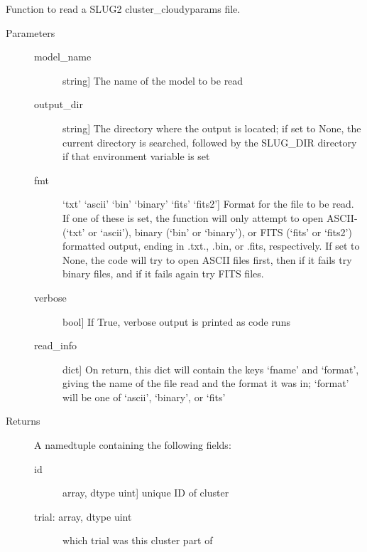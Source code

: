 \documentclass[letterpaper,10pt,english]{sphinxmanual}
\begin{document}
\begin{fulllineitems}
\label{cloudy:slugpy.cloudy.read_cluster_cloudyparams}
Function to read a SLUG2 cluster\_cloudyparams file.
\begin{description}
\item[{Parameters}] \leavevmode\begin{description}
\item[{model\_name}] \leavevmode{[}string{]}
The name of the model to be read

\item[{output\_dir}] \leavevmode{[}string{]}
The directory where the output is located; if set to None,
the current directory is searched, followed by the SLUG\_DIR
directory if that environment variable is set

\item[{fmt}] \leavevmode{[}`txt' \textbar{} `ascii' \textbar{} `bin' \textbar{} `binary' \textbar{} `fits' \textbar{} `fits2'{]}
Format for the file to be read. If one of these is set, the
function will only attempt to open ASCII-(`txt' or `ascii'), 
binary (`bin' or `binary'), or FITS (`fits' or `fits2')
formatted output, ending in .txt., .bin, or .fits,
respectively. If set to None, the code will try to open
ASCII files first, then if it fails try binary files, and if
it fails again try FITS files.

\item[{verbose}] \leavevmode{[}bool{]}
If True, verbose output is printed as code runs

\item[{read\_info}] \leavevmode{[}dict{]}
On return, this dict will contain the keys `fname' and
`format', giving the name of the file read and the format it
was in; `format' will be one of `ascii', `binary', or `fits'

\end{description}

\item[{Returns}] \leavevmode
A namedtuple containing the following fields:
\begin{description}
\item[{id}] \leavevmode{[}array, dtype uint{]}
unique ID of cluster

\item[{trial: array, dtype uint}] \leavevmode
which trial was this cluster part of


\end{description}
\end{description}
\end{fulllineitems}
\end{document}
